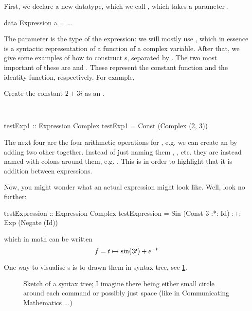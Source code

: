 First, we declare a new datatype, which we call , which takes a parameter . 
\begin{code}
data Expression a = ...
\end{code}
The parameter is the type of the expression: we will mostly use , which in essence is a syntactic representation of a function of a complex variable.
After that, we give some examples of how to construct s,
separated by \cmd{|}. The two most important of these are  and
. These represent the constant function and the identity function,
respectively.  For example, 
\begin{example}
  Create the constant $2+3i$ as an . 
\end{example}
\begin{solution}
~  
\begin{code}
testExp1 :: Expression Complex 
testExp1 = Const (Complex (2, 3))
\end{code} 
\end{solution}

The next four are the four arithmetic operations for , e.g. we can create an  by adding two other together. 
Instead of just naming them \cmd{+}, \cmd{*}, etc. they are instead named with
colons around them, e.g. \cmd{:+:}. This is in order to highlight that it is
addition between expressions.
\begin{example}
Now, you might wonder what an actual expression might look like. Well, look no further:

\begin{code}
testExpression :: Expression Complex
testExpression = Sin (Const 3 :*: Id) :+: Exp (Negate (Id))
\end{code}
  which in math can be written
\begin{equation*}
  f = t \mapsto \sin (3t) + e^{-t}
\end{equation*}
\end{example}
One way to visualise s is to drawn them in syntax tree, see
\ref{fig:expression-syntax-tree}. 
\begin{figure}
  \centering
  \caption{Sketch of a syntax tree; I imagine there being either small circle around each command or possibly just space (like in Communicating Mathematics ...)}
  \label{fig:expression-syntax-tree}
\end{figure}

